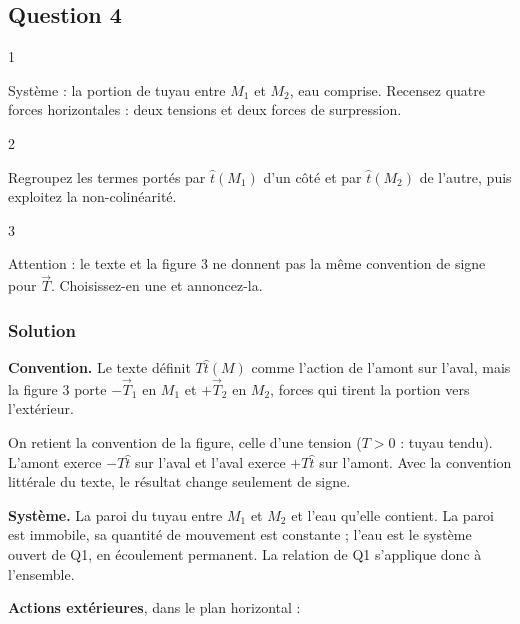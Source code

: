 \documentclass[11pt,a4paper]{article}
\begin{document}
\hypertarget{question-4}{%
\subsection{Question 4}\label{question-4}}

\begin{indication}{1}

Système : la portion de tuyau entre \(M_1\) et \(M_2\), eau comprise. Recensez quatre forces horizontales : deux tensions et deux forces de surpression.

\end{indication}

\begin{indication}{2}

Regroupez les termes portés par \(\hat t(M_1)\) d'un côté et par \(\hat t(M_2)\) de l'autre, puis exploitez la non-colinéarité.

\end{indication}

\begin{indication}{3}

Attention : le texte et la figure 3 ne donnent pas la même convention de signe pour \(\vec T\). Choisissez-en une et annoncez-la.

\end{indication}

\hypertarget{solution-3}{%
\subsubsection{Solution}\label{solution-3}}

\textbf{Convention.} Le texte définit \(T\hat t(M)\) comme l'action de l'amont sur l'aval, mais la figure 3 porte \(-\vec T_1\) en \(M_1\) et \(+\vec T_2\) en \(M_2\), forces qui tirent la portion vers l'extérieur.

On retient la convention de la figure, celle d'une tension (\(T>0\) : tuyau tendu). L'amont exerce \(-T\hat t\) sur l'aval et l'aval exerce \(+T\hat t\) sur l'amont. Avec la convention littérale du texte, le résultat change seulement de signe.

\textbf{Système.} La paroi du tuyau entre \(M_1\) et \(M_2\) et l'eau qu'elle contient. La paroi est immobile, sa quantité de mouvement est constante ; l'eau est le système ouvert de Q1, en écoulement permanent. La relation de Q1 s'applique donc à l'ensemble.

\textbf{Actions extérieures}, dans le plan horizontal :
\end{document}
